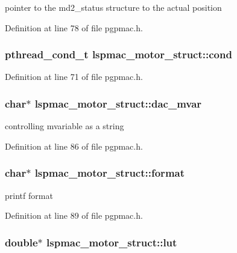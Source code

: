 pointer to the md2\_\-status structure to the actual position 

Definition at line 78 of file pgpmac.h.\hypertarget{structlspmac__motor__struct_aa0ea4108b8fed5b41ff91ca7266f3d84}{
\subsubsection[{cond}]{\setlength{\rightskip}{0pt plus 5cm}pthread\_\-cond\_\-t {\bf lspmac\_\-motor\_\-struct::cond}}}
\label{structlspmac__motor__struct_aa0ea4108b8fed5b41ff91ca7266f3d84}


Definition at line 71 of file pgpmac.h.\hypertarget{structlspmac__motor__struct_a05dff021221abbc1bf656039fffb3275}{
\subsubsection[{dac\_\-mvar}]{\setlength{\rightskip}{0pt plus 5cm}char$\ast$ {\bf lspmac\_\-motor\_\-struct::dac\_\-mvar}}}
\label{structlspmac__motor__struct_a05dff021221abbc1bf656039fffb3275}


controlling mvariable as a string 

Definition at line 86 of file pgpmac.h.\hypertarget{structlspmac__motor__struct_aba3d9d00271187128506bbbb1d77da19}{
\subsubsection[{format}]{\setlength{\rightskip}{0pt plus 5cm}char$\ast$ {\bf lspmac\_\-motor\_\-struct::format}}}
\label{structlspmac__motor__struct_aba3d9d00271187128506bbbb1d77da19}


printf format 

Definition at line 89 of file pgpmac.h.\hypertarget{structlspmac__motor__struct_a7b43671f7f3e06521f6cf91fb9ac707d}{
\subsubsection[{lut}]{\setlength{\rightskip}{0pt plus 5cm}double$\ast$ {\bf lspmac\_\-motor\_\-struct::lut}}}
\label{structlspmac__motor__struct_a7b43671f7f3e06521f6cf91fb9ac707d}


